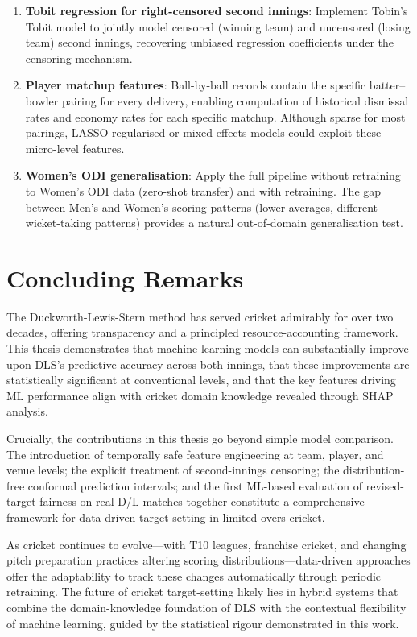 \documentclass[12pt,a4paper,oneside]{report}
\begin{document}
\begin{enumerate}
    \item \textbf{Tobit regression for right-censored second innings}: Implement Tobin's Tobit model to jointly model censored (winning team) and uncensored (losing team) second innings, recovering unbiased regression coefficients under the censoring mechanism.

    \item \textbf{Player matchup features}: Ball-by-ball records contain the specific batter--bowler pairing for every delivery, enabling computation of historical dismissal rates and economy rates for each specific matchup.  Although sparse for most pairings, LASSO-regularised or mixed-effects models could exploit these micro-level features.

    \item \textbf{Women's ODI generalisation}: Apply the full pipeline without retraining to Women's ODI data (zero-shot transfer) and with retraining.  The gap between Men's and Women's scoring patterns (lower averages, different wicket-taking patterns) provides a natural out-of-domain generalisation test.
\end{enumerate}

\section{Concluding Remarks}

The Duckworth-Lewis-Stern method has served cricket admirably for over two decades, offering transparency and a principled resource-accounting framework.  This thesis demonstrates that machine learning models can substantially improve upon DLS's predictive accuracy across both innings, that these improvements are statistically significant at conventional levels, and that the key features driving ML performance align with cricket domain knowledge revealed through SHAP analysis.

Crucially, the contributions in this thesis go beyond simple model comparison.  The introduction of temporally safe feature engineering at team, player, and venue levels; the explicit treatment of second-innings censoring; the distribution-free conformal prediction intervals; and the first ML-based evaluation of revised-target fairness on real D/L matches together constitute a comprehensive framework for data-driven target setting in limited-overs cricket.

As cricket continues to evolve---with T10 leagues, franchise cricket, and changing pitch preparation practices altering scoring distributions---data-driven approaches offer the adaptability to track these changes automatically through periodic retraining.  The future of cricket target-setting likely lies in hybrid systems that combine the domain-knowledge foundation of DLS with the contextual flexibility of machine learning, guided by the statistical rigour demonstrated in this work.
\end{document}
